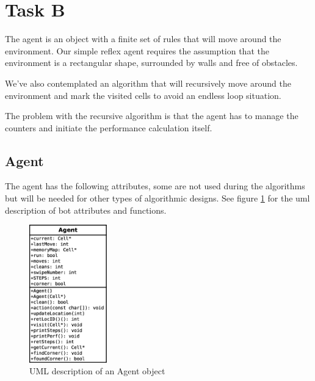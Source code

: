 
\section{Task B}
The agent is an object with a finite set of rules that will move around the
environment.  Our simple reflex agent requires the assumption that the
environment is a rectangular shape, surrounded by walls and free of obstacles.

We've also contemplated an algorithm that will recursively move around the
environment and mark the visited cells to avoid an endless loop situation.

The problem with the recursive algorithm is that the agent has to manage the
counters and initiate the performance calculation itself.

\subsection{Agent}
The agent has the following attributes, some are not used during the algorithms
but will be needed for other types of algorithmic designs. See figure
\ref{fig:agent_uml} for the uml description of bot attributes and functions.

\begin{figure}[h] \label{fig:agent_uml}	\centering
\includegraphics[width=0.3\textwidth]{agent_um}
\caption{UML description of an Agent object}
\end{figure}

